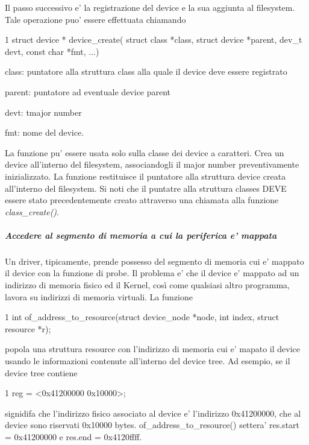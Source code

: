 Il passo successivo e' la registrazione del device e la sua aggiunta al filesystem. Tale operazione puo' essere effettuata chiamando 
\begin{DoxyCode}
1 struct device * device\_create( struct class *class, struct device *parent, dev\_t devt, const char *fmt,
       ...)
\end{DoxyCode}

\begin{DoxyItemize}
\item class\+: puntatore alla struttura class alla quale il device deve essere registrato
\item parent\+: puntatore ad eventuale device parent
\item devt\+: tmajor number
\item fmt\+: nome del device.
\end{DoxyItemize}

La funzione pu' essere usata solo sulla classe dei device a caratteri. Crea un device all'interno del filesystem, associandogli il major number preventivamente inizializzato. La funzione restituisce il puntatore alla struttura device creata all'interno del filesystem. Si noti che il puntatre alla struttura classes D\+E\+V\+E essere stato precedentemente creato attraverso una chiamata alla funzione {\itshape class\+\_\+create()}.

\subparagraph*{Accedere al segmento di memoria a cui la periferica e' mappata}

Un driver, tipicamente, prende possesso del segmento di memoria cui e' mappato il device con la funzione di probe. Il problema e' che il device e' mappato ad un indirizzo di memoria fisico ed il Kernel, così come qualsiasi altro programma, lavora su indirizzi di memoria virtuali. La funzione


\begin{DoxyCode}
1 int of\_address\_to\_resource(struct device\_node *node, int index, struct resource *r);
\end{DoxyCode}


popola una struttura resource con l'indirizzo di memoria cui e' mapato il device usando le informazioni contenute all'interno del device tree. Ad esempio, se il device tree contiene 
\begin{DoxyCode}
1 reg = <0x41200000 0x10000>;
\end{DoxyCode}
 signidifa che l'indirizzo fisico associato al device e' l'indirizzo 0x41200000, che al device sono riservati 0x10000 bytes. of\+\_\+address\+\_\+to\+\_\+resource() settera' res.\+start = 0x41200000 e res.\+end = 0x4120ffff.

